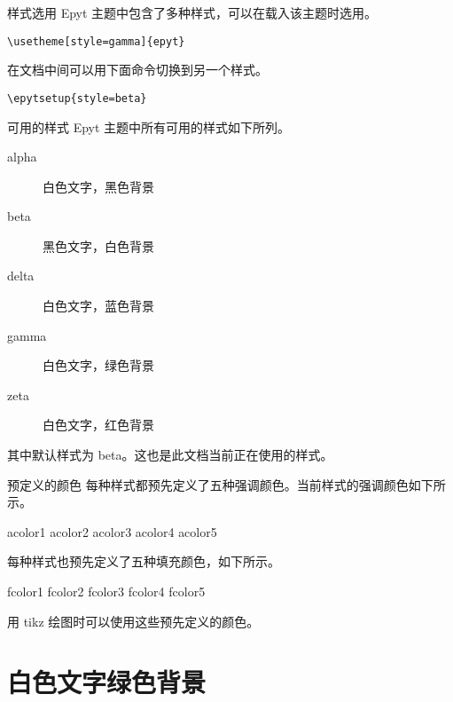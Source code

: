 \documentclass[14pt,notheorems,xcolor={rgb}]{beamer}
\newcommand{\mylead}[1]{\textcolor{acolor1}{#1}}
\newcommand{\mybold}[1]{\textcolor{acolor2}{#1}}
\begin{document}
\begin{frame}[fragile]{样式选用}
\mylead{Epyt} 主题中包含了多种样式，可以在载入该主题时选用。
\begin{lstlisting}
\usetheme[style=gamma]{epyt}
\end{lstlisting}
\pause 在文档中间可以用下面命令切换到另一个样式。
\begin{lstlisting}
\epytsetup{style=beta}
\end{lstlisting}
\end{frame}

\begin{frame}{可用的样式}
\mylead{Epyt} 主题中所有可用的样式如下所列。
\begin{description}
  \item[alpha] 白色文字，黑色背景
  \item[beta]  黑色文字，白色背景
  \item[delta] 白色文字，蓝色背景
  \item[gamma] 白色文字，绿色背景
  \item[zeta]  白色文字，红色背景
\end{description}
\pause
其中默认样式为 \mybold{beta}。这也是此文档当前正在使用的样式。
\end{frame}

\begin{frame}{预定义的颜色}
每种样式都预先定义了五种强调颜色。当前样式的强调颜色如下所示。
\begin{flushleft}
\textcolor{acolor1}{acolor1}
\textcolor{acolor2}{acolor2}
\textcolor{acolor3}{acolor3}
\textcolor{acolor4}{acolor4}
\textcolor{acolor5}{acolor5}
\end{flushleft}
\pause 每种样式也预先定义了五种填充颜色，如下所示。
\begin{flushleft}
\colorbox{fcolor1}{fcolor1}
\colorbox{fcolor2}{fcolor2}
\colorbox{fcolor3}{fcolor3}
\colorbox{fcolor4}{fcolor4}
\colorbox{fcolor5}{fcolor5}
\end{flushleft}
\pause 用 tikz 绘图时可以使用这些预先定义的颜色。
\end{frame}


\begin{frame}[plain]\transboxout
\titlepage
\end{frame}

\section{白色文字绿色背景}
\end{document}
